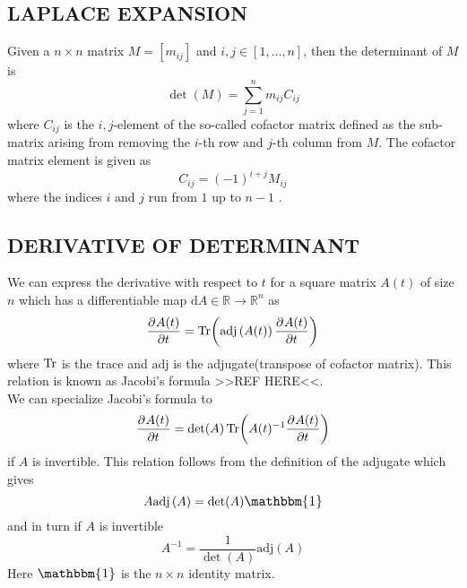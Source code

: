 \documentclass[a4paper, hidelinks, 10pt]{article}\usepackage[utf8]{inputenc}
\let\oldsubsection\subsection
\renewcommand{\subsection}[1]{\centering \oldsubsection{{#1}} \justifying}
\newcommand{\md}{\mathrm{d}} %
\newcommand{\rarr}{\rightarrow} %
\newcommand{\I}{\scalebox{1.1}{$\mathbbm{1}$}}
\newcommand{\suml}[2]{\sum\limits_{#1=1}^{#2}}
\begin{document}
\subsection{LAPLACE EXPANSION}
\label{sub:laplace_expansion}
    Given a $n\times n$ matrix $M=[m_{ij}]$ and $i,j\in[1,\dots,n]$, then the
    determinant of $M$ is
        \begin{equation}
            \det(M) = \suml{j}{n}m_{ij}C_{ij}
            \label{eq:laplaceexp}
        \end{equation}
    where $C_{ij}$ is the $i,j$-element of the so-called cofactor matrix
    defined as the sub-matrix arising from removing the $i$-th row and $j$-th
    column from $M$. The cofactor matrix element is given as
        \begin{equation}
            C_{ij} = (-1)^{i+j}M_{ij}
            \label{eq:cofactor}
        \end{equation}
    where the indices $i$ and $j$ run from $1$ up to $n-1$ \cite{linalgDavid}.

\subsection{DERIVATIVE OF DETERMINANT}
\label{sub:derivative_of_determinant}
    We can express the derivative with respect to $t$ for a square matrix
    $A(t)$ of size $n$ which has a differentiable map $\md
    A\in\mathbb{R}\rarr\mathbb{R}^n$ as
        \begin{equation}
            \prd{t}[A(t)] = \Tr(\text{adj}\left(A(t)\right)\prd{t}[A(t)])
            \label{eq:JacobisDef}
        \end{equation}
    where $\Tr$ is the trace and $\text{adj}$ is the adjugate(transpose of
    cofactor matrix). This relation is known as Jacobi's formula >>REF HERE<<.
    \\
    We can specialize Jacobi's formula to
        \begin{equation}
            \prd{t}[A(t)] = \det(A)\Tr(A(t)^{-1}\prd{t}[A(t)])
            \label{eq:jacobiSpecial}
        \end{equation}
    if $A$ is invertible. This relation follows from the definition of the
    adjugate which gives
        \begin{equation}
            A\text{adj}\left(A\right) = \det(A)\I
            \label{eq:aadja}
        \end{equation}
    and in turn if $A$ is invertible
        \begin{equation}
            A^{-1} = \frac{1}{\det(A)}\text{adj}\left(A\right)
            \label{eq:aadjainv}
        \end{equation}
    Here $\I$ is the $n\times n$ identity matrix.
\end{document}

